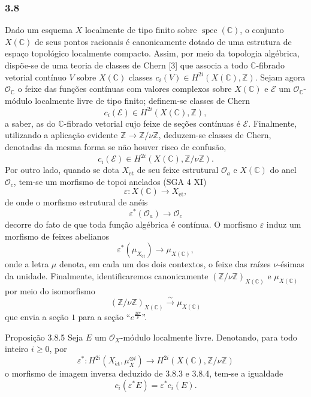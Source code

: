 \subsubsection*{3.8}
Dado um esquema $X$ localmente de tipo finito sobre $\operatorname{spec}(\mathbb C)$, o conjunto $X(\mathbb C)$ de seus pontos racionais é canonicamente dotado de uma estrutura de espaço topológico localmente compacto. Assim, por meio da topologia algébrica, dispõe-se de uma teoria de classes de Chern [3] que associa a todo $\mathbb C$-fibrado vetorial contínuo $V$ sobre $X(\mathbb C)$ classes $c_i(V)\in H^{2i}(X(\mathbb C),\mathbb Z)$. Sejam agora $\mathcal O_\mathbb C$ o feixe das funções contínuas com valores complexos sobre $X(\mathbb C)$ e $\mathcal E$ um $\mathcal O_\mathbb C$-módulo localmente livre de tipo finito; definem-se classes de Chern
\[
c_i(\mathcal E)\in H^{2i}(X(\mathbb C),\mathbb Z),
\]
a saber, as do $\mathbb C$-fibrado vetorial cujo feixe de seções contínuas é $\mathcal E$. Finalmente, utilizando a aplicação evidente $\mathbb Z\to\mathbb Z/\nu\mathbb Z$, deduzem-se classes de Chern, denotadas da mesma forma se não houver risco de confusão,
\[
c_i(\mathcal E)\in H^{2i}(X(\mathbb C),\mathbb Z/\nu\mathbb Z).
\tag{3.8.1}
\]
Por outro lado, quando se dota $X_{\mathrm{\acute et}}$ de seu feixe estrutural $\mathcal O_a$ e $X(\mathbb C)$ do anel $\mathcal O_c$, tem-se um morfismo de topoi anelados (SGA 4 XI)
\[
\varepsilon:X(\mathbb C)\to X_{\mathrm{\acute et}},
\]
de onde o morfismo estrutural de anéis
\[
\varepsilon^*(\mathcal O_a)\to\mathcal O_c
\tag{3.8.2}
\]
decorre do fato de que toda função algébrica é contínua. O morfismo $\varepsilon$ induz um morfismo de feixes abelianos
\[
\varepsilon^*(\mu_{X_{\mathrm{\acute et}}})\to \mu_{X(\mathbb C)},
\tag{3.8.3}
\]
onde a letra $\mu$ denota, em cada um dos dois contextos, o feixe das raízes $\nu$-ésimas da unidade. Finalmente, identificaremos canonicamente $(\mathbb Z/\nu\mathbb Z)_{X(\mathbb C)}$ e $\mu_{X(\mathbb C)}$ por meio do isomorfismo
\[
(\mathbb Z/\nu\mathbb Z)_{X(\mathbb C)}
 \xrightarrow{\sim}\mu_{X(\mathbb C)}
\tag{3.8.4}
\]
que envia a seção $1$ para a seção ``$e^{\frac{2i\pi}{\nu}}$''.

\begin{statement}{Proposição 3.8.5}
Seja $E$ um $\mathcal O_X$-módulo localmente livre. Denotando, para todo inteiro $i\ge0$, por
\[
\varepsilon^*:H^{2i}(X_{\mathrm{\acute et}},\mu_X^{\otimes i})
\to H^{2i}(X(\mathbb C),\mathbb Z/\nu\mathbb Z)
\]
o morfismo de imagem inversa deduzido de 3.8.3 e 3.8.4, tem-se a igualdade
\[
c_i(\varepsilon^*E)=\varepsilon^*c_i(E).
\]
\end{statement}
